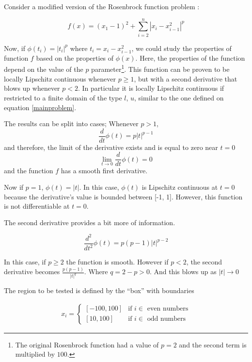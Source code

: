 Consider a modified version of the Rosenbrock function problem \citep{rosenbrock}:

\begin{equation} \label{modifiedrosenbrock}
    f(x) = (x_1 - 1)^2 + \sum_{i = 2}^n |x_i - x_{i - 1}^2|^p
\end{equation}

Now, if $\phi(t_i) = |t_i|^p$ where $t_i = x_i - x_{i - 1}^2$, we could study the properties of function $f$ based on the properties of $\phi(x)$. Here, the properties of the function depend on the value of the $p$ parameter\footnote{The original Rosenbrock function had a value of $p = 2$ and the second term is multiplied by $100$.}. This function can be proven to be locally Lipschitz continuous whenever $p \geq 1$, but with a second derivative that blows up whenever $p < 2$. In particular it is locally Lipschitz continuous if restricted to a finite domain of the type $l$, $u$, similar to the one defined on equation \eqref{mainproblem}.

The results can be split into cases; Whenever $p > 1$, 
\begin{equation}\label{firstderiv}
  \frac{d}{dt} \phi(t) = p |t|^{p-1}
\end{equation}
and therefore, the limit of the derivative exists and is equal to zero near $t = 0$ \[ \lim_{t \to 0} \frac{d}{dt}\phi(t) = 0 \] and the function $f$ has a smooth first derivative.

Now if $p = 1$, $\phi(t) = |t|$. In this case, $\phi(t)$ is Lipschitz continuous at $t = 0$ because the derivative's value is bounded between [-1, 1]. However, this function is not differentiable at $t = 0$.

The second derivative provides a bit more of information.

\begin{equation}\label{secondderiv}
  \frac{d^2}{dt^2} \phi(t) = p(p-1) |t|^{p-2}
\end{equation}

In this case, if $p \geq 2$ the function is smooth. However if $p < 2$, the second derivative becomes $\frac{p(p-1)}{|t|^{q}}$. Where $q = 2 - p > 0$. And this blows up as $|t| \to 0$



The region to be tested is defined by the ``box'' with boundaries

\begin{equation}
  \begin{aligned}
    x_i = 
    \begin{cases}
      [-100, 100] & \text{if } i \in \text{ even numbers} \\
      [10, 100] & \text{if } i \in \text{ odd numbers}
    \end{cases}
  \end{aligned}
\end{equation}

